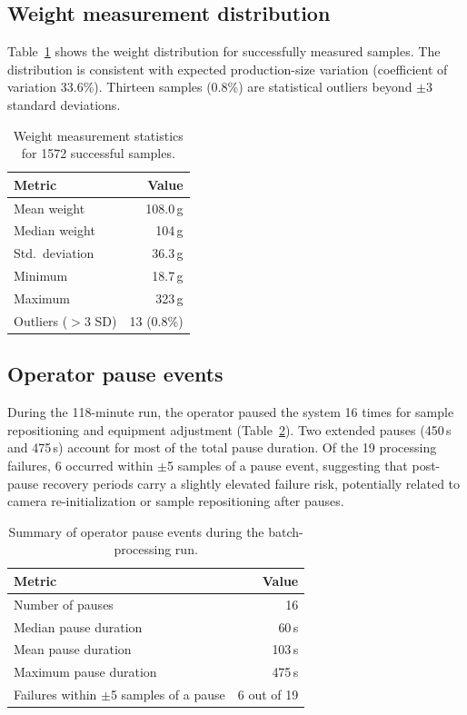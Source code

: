 \documentclass[9pt]{osa-supplemental-document}
\begin{document}
\subsection{Weight measurement distribution}

Table~\ref{tab:weight_stats} shows the weight distribution for successfully measured samples. The distribution is consistent with expected production-size variation (coefficient of variation 33.6\%). Thirteen samples (0.8\%) are statistical outliers beyond $\pm$3 standard deviations.

\begin{table}[htbp]
\centering
\caption{Weight measurement statistics for 1572 successful samples.}
\label{tab:weight_stats}
\small
\begin{tabular}{lr}
\toprule
\textbf{Metric} & \textbf{Value} \\
\midrule
Mean weight   & 108.0\,g \\
Median weight & 104\,g \\
Std.\ deviation & 36.3\,g \\
Minimum       & 18.7\,g \\
Maximum       & 323\,g \\
Outliers ($>$3 SD) & 13 (0.8\%) \\
\bottomrule
\end{tabular}
\end{table}

\subsection{Operator pause events}

During the 118-minute run, the operator paused the system 16 times for sample repositioning and equipment adjustment (Table~\ref{tab:pause_summary}). Two extended pauses (450\,s and 475\,s) account for most of the total pause duration. Of the 19 processing failures, 6 occurred within $\pm$5 samples of a pause event, suggesting that post-pause recovery periods carry a slightly elevated failure risk, potentially related to camera re-initialization or sample repositioning after pauses.

\begin{table}[htbp]
\centering
\caption{Summary of operator pause events during the batch-processing run.}
\label{tab:pause_summary}
\small
\begin{tabular}{lr}
\toprule
\textbf{Metric} & \textbf{Value} \\
\midrule
Number of pauses & 16 \\
Median pause duration & 60\,s \\
Mean pause duration & 103\,s \\
Maximum pause duration & 475\,s \\
Failures within $\pm$5 samples of a pause & 6 out of 19 \\
\bottomrule
\end{tabular}
\end{table}
\end{document}
